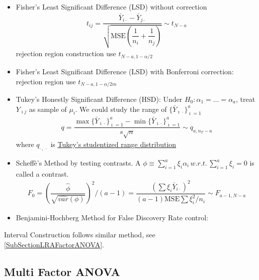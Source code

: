 \begin{itemize}[topsep=2pt,itemsep=0pt]
    \item Fisher's Least Significant Difference (LSD) without correction
    \begin{align*}
        t_{ij}=\dfrac{ \bar{Y}_{i\cdot }-\bar{Y}_{j\cdot } }{ \sqrt{\mathrm{ MSE }\left(\dfrac{ 1 }{ n_i }+\dfrac{ 1 }{ n_j }  \right) } }\sim t_{N-a}  
    \end{align*}
    rejection region construction use $ t_{N-a,1-\alpha /2} $
    \item Fisher's Least Significant Difference (LSD) with Bonferroni correction: rejection region use $ t_{N-a, 1-\alpha /2m} $
    \item Tukey's Honestly Significant Difference (HSD): Under $ H_0:\alpha _1=\ldots=\alpha _a $, treat $ Y_{\imath j} $ as sample of $ \mu _\imath $. We could study the range of $ \{\bar{Y}_{\imath\cdot }\}_{\imath=1}^a $
    \begin{align*}
        q=\dfrac{ \max\{\bar{Y}_{\imath\cdot }\}_{\imath=1}^a-\min\{\bar{Y}_{\imath\cdot }\}_{\imath=1}^a }{ s\sqrt{n} }  \sim q_{a,n_T-a}
    \end{align*}
    where $ q_{\cdot \, ,\, \cdot } $ is \hyperlink{TukeyStudentizedRangeDistribution}{Tukey's  studentized range distribution}
    \item Scheff\`{e}'s Method by testing contrasts. A $ \phi \equiv\sum_{i=1}^a\xi _i\alpha _i  \,w.r.t.\,\sum_{i=1}^a\xi _i=0$ is called a contrast. 
    \begin{align*}
         F_0=\left(\dfrac{ \hat{\phi } }{ \sqrt{\hat{var}(\phi )} }\right)^2\big/(a-1)=\dfrac{ (\sum \xi_i\bar{Y}_{i\cdot })^2 }{ (a-1)\mathrm{ MSE }\sum \xi _i^2/n_i  } \sim F_{a-1,N-a}
    \end{align*}
    \item Benjamini-Hochberg Method for False Discovery Rate control:
\end{itemize}

    
    Interval Construction follows similar method, see \autoref{SubSectionLRAFactorANOVA}.












\subsection{Multi Factor ANOVA}